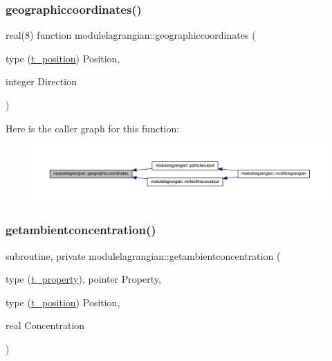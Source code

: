 \subsubsection{\texorpdfstring{geographiccoordinates()}{geographiccoordinates()}}
{\footnotesize\ttfamily real(8) function modulelagrangian\+::geographiccoordinates (\begin{DoxyParamCaption}\item[{type (\mbox{\hyperlink{structmodulelagrangian_1_1t__position}{t\+\_\+position}})}]{Position,  }\item[{integer}]{Direction }\end{DoxyParamCaption})\hspace{0.3cm}{\ttfamily [private]}}

Here is the caller graph for this function\+:\nopagebreak
\begin{figure}[H]
\begin{center}
\leavevmode
\includegraphics[width=350pt]{namespacemodulelagrangian_ad718f547ef233587149bd01b55f9e9dd_icgraph}
\end{center}
\end{figure}
\mbox{\label{namespacemodulelagrangian_a379f0c8ed7aad4570a94ad678e1dea6e}} 
\subsubsection{\texorpdfstring{getambientconcentration()}{getambientconcentration()}}
{\footnotesize\ttfamily subroutine, private modulelagrangian\+::getambientconcentration (\begin{DoxyParamCaption}\item[{type (\mbox{\hyperlink{structmodulelagrangian_1_1t__property}{t\+\_\+property}}), pointer}]{Property,  }\item[{type (\mbox{\hyperlink{structmodulelagrangian_1_1t__position}{t\+\_\+position}})}]{Position,  }\item[{real}]{Concentration }\end{DoxyParamCaption})\hspace{0.3cm}{\ttfamily [private]}}


